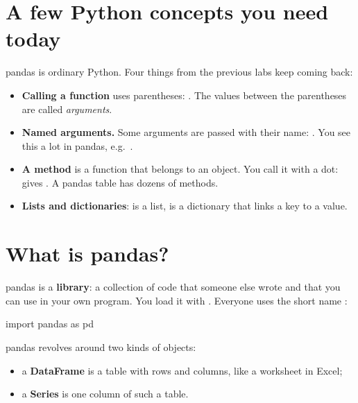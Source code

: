 \documentclass[11pt,a4paper]{article}
\begin{document}
\section{A few Python concepts you need today}

pandas is ordinary Python. Four things from the previous labs keep
coming back:

\begin{itemize}
  \item \textbf{Calling a function} uses parentheses:
        . The values between the parentheses are
        called \emph{arguments}.
  \item \textbf{Named arguments.} Some arguments are passed with their
        name: . You see this a lot
        in pandas, e.g.\ .
  \item \textbf{A method} is a function that belongs to an object. You
        call it with a dot:  gives
        . A pandas table has dozens of methods.
  \item \textbf{Lists and dictionaries}:  is
        a list,  is a dictionary that links a
        key to a value.
\end{itemize}

\section{What is pandas?}

pandas is a \textbf{library}: a collection of code that someone else
wrote and that you can use in your own program. You load it with
. Everyone uses the short name :

\begin{python}[noout]
import pandas as pd
\end{python}

pandas revolves around two kinds of objects:

\begin{itemize}
  \item a \textbf{DataFrame} is a table with rows and columns, like a
        worksheet in Excel;
  \item a \textbf{Series} is one column of such a table.
\end{itemize}
\end{document}
